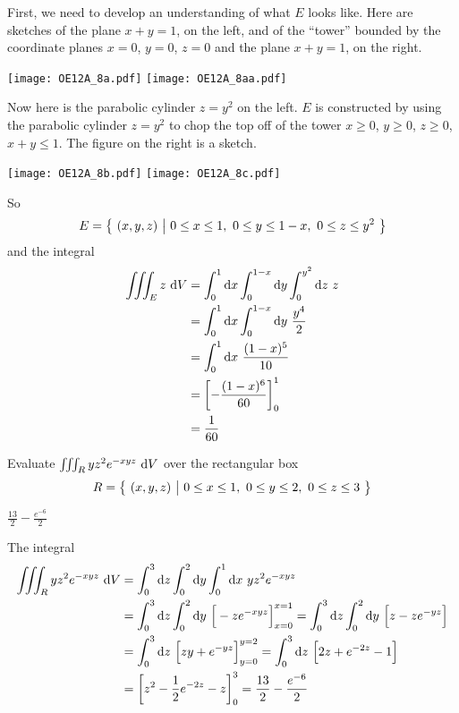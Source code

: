 \begin{solution}
First, we need to develop an understanding of what $E$ looks like.
Here are sketches of the plane $x+y=1$, on the left, and of the ``tower''
bounded by the coordinate planes $x=0$, $y=0$, $z=0$ and the
plane $x+y=1$, on the right.
\begin{center}
     \texttt{[image: OE12A\_8a.pdf]}\qquad
     \texttt{[image: OE12A\_8aa.pdf]}
\end{center}
Now here is the parabolic cylinder $z=y^2$ on the left.
$E$ is constructed by using the parabolic cylinder $z=y^2$ to chop the top
off of the tower $x\ge 0$, $y\ge 0$, $z\ge 0$,  $x+y\le 1$. The figure 
on the right is a sketch.
\begin{center}
     \texttt{[image: OE12A\_8b.pdf]}\qquad
     \texttt{[image: OE12A\_8c.pdf]}
\end{center}
So
\begin{equation*}
E=\big\{ \ (x,y,z)\ \big|\ 0\le x\le 1,\ 0\le y\le 1-x,\ 0\le z\le y^2\ \big\}
\end{equation*}
and the integral
\begin{align*}
\iiint_E z\ \mathrm{d}V
&=\int_0^1\mathrm{d}x\int_0^{1-x}\mathrm{d}y\int_0^{y^2}\mathrm{d}z\ z \\
&=\int_0^1\mathrm{d}x\int_0^{1-x}\mathrm{d}y\ \frac{y^4}{2} \\
&=\int_0^1\mathrm{d}x\ \frac{(1-x)^5}{10} \\
&=\left[-\frac{(1-x)^6}{60}\right]_0^1 \\
&=\frac{1}{60}
\end{align*} 
\end{solution}

\begin{question}[M200 2012D] %
Evaluate  $\tripInt_R yz^2 e^{-xyz}\ \dee{V}$ over the rectangular
box
\begin{equation*}
R=\big\{ \ (x,y,z)\ \big|\ 0\le x\le 1,\ 0\le y\le 2,\  0\le z\le 3\ \big\}
\end{equation*} 
\end{question}

%

\begin{answer}
$\frac{13}{2}-\frac{e^{-6}}{2}$
\end{answer}

\begin{solution}
The integral
\begin{align*}
\iiint_R yz^2 e^{-xyz}\ \mathrm{d}V
&=\int_0^3\mathrm{d}z\int_0^2\mathrm{d}y\int_0^1\mathrm{d}x\ yz^2 e^{-xyz} \\
&=\int_0^3\mathrm{d}z\int_0^2\mathrm{d}y\ \Big[-z e^{-xyz}\Big]_{x=0}^{x=1} 
  =\int_0^3\mathrm{d}z\int_0^2\mathrm{d}y\ \Big[z-z e^{-yz}\Big] \\
&=\int_0^3\mathrm{d}z\ \Big[zy+ e^{-yz}\Big]_{y=0}^{y=2}
=\int_0^3\mathrm{d}z\ \Big[2z+ e^{-2z}-1\Big] \\
&=\left[z^2-\frac{1}{2} e^{-2z}-z\right]_0^3 
=\frac{13}{2}-\frac{e^{-6}}{2}
\end{align*}
\end{solution}

